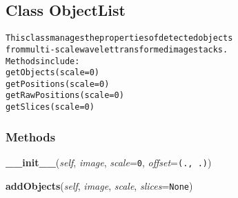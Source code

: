 

\subsection{Class ObjectList}

    \label{multireg:objectlist:ObjectList}
\begin{alltt}
This class manages the properties of detected objects
from multi-scale wavelet transformed image stacks. 
Methods include:
    getObjects(scale=0)
    getPositions(scale=0)
    getRawPositions(scale=0)
    getSlices(scale=0)\end{alltt}



  \subsubsection{Methods}

    \label{multireg:objectlist:ObjectList:__init__}
    \vspace{0.5ex}

    \begin{boxedminipage}{\textwidth}

    \raggedright \textbf{\_\_init\_\_}(\textit{self}, \textit{image}, \textit{scale}=\texttt{0\-}, \textit{offset}=\texttt{(\-.\-,\-~\-.\-)\-})

    \end{boxedminipage}

    \label{multireg:objectlist:ObjectList:addObjects}
    \vspace{0.5ex}

    \begin{boxedminipage}{\textwidth}

    \raggedright \textbf{addObjects}(\textit{self}, \textit{image}, \textit{scale}, \textit{slices}=\texttt{N\-o\-n\-e\-})

    \end{boxedminipage}

